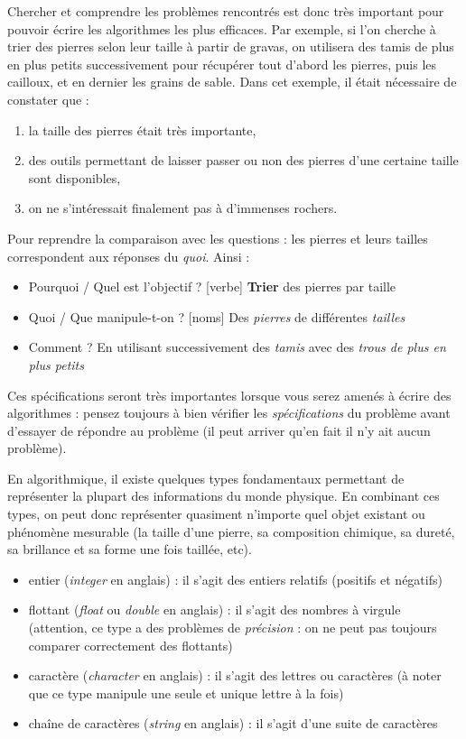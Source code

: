 \documentclass[11pt,a4paper]{article}
\begin{document}
\medskip

Chercher et comprendre les problèmes rencontrés est donc très important pour pouvoir écrire les algorithmes les plus efficaces.
Par exemple, si l'on cherche à trier des pierres selon leur taille à partir de gravas, on utilisera des tamis de plus en plus petits successivement pour récupérer tout d'abord les pierres, puis les cailloux, et en dernier les grains de sable.
Dans cet exemple, il était nécessaire de constater que :
\begin{enumerate}
\item la taille des pierres était très importante,
\item des outils permettant de laisser passer ou non des pierres d'une certaine taille sont disponibles,
\item on ne s'intéressait finalement pas à d'immenses rochers.
\end{enumerate}
Pour reprendre la comparaison avec les questions : les pierres et leurs tailles correspondent aux réponses du \textit{quoi}.
Ainsi :
\begin{itemize}
\item Pourquoi / Quel est l'objectif ? [verbe] \textbf{Trier} des pierres par taille
\item Quoi / Que manipule-t-on ? [noms] Des \textit{pierres} de différentes \textit{tailles}
\item Comment ? En utilisant successivement des \textit{tamis} avec des \textit{trous de plus en plus petits}
\end{itemize}

\medskip

Ces spécifications seront très importantes lorsque vous serez amenés à écrire des algorithmes : pensez toujours à bien vérifier les \textit{spécifications} du problème avant d'essayer de répondre au problème (il peut arriver qu'en fait il n'y ait aucun problème).

\bigskip

En algorithmique, il existe quelques types fondamentaux permettant de représenter la plupart des informations du monde physique.
En combinant ces types, on peut donc représenter quasiment n'importe quel objet existant ou phénomène mesurable (la taille d'une pierre, sa composition chimique, sa dureté, sa brillance et sa forme une fois taillée, etc).

\begin{itemize}
\item entier (\textit{integer} en anglais) : il s'agit des entiers relatifs (positifs et négatifs)
\item flottant (\textit{float} ou \textit{double} en anglais) : il s'agit des nombres à virgule (attention, ce type a des problèmes de \textit{précision} : on ne peut pas toujours comparer correctement des flottants)
\item caractère (\textit{character} en anglais) : il s'agit des lettres ou caractères (à noter que ce type manipule une seule et unique lettre à la fois)
\item chaîne de caractères (\textit{string} en anglais) : il s'agit d'une suite de caractères
\end{itemize}
\end{document}
